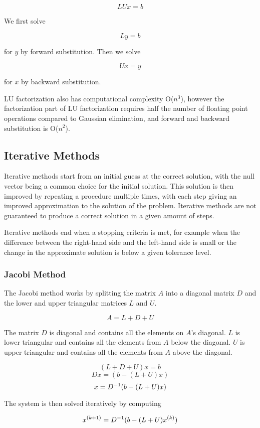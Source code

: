 $$LUx = b$$

We first solve 

$$Ly = b$$

for $y$ by forward substitution. Then we solve 

$$Ux = y$$

for $x$ by backward substitution.

LU factorization also has computational complexity O($n^3$), however the factorization part of 
LU factorization requires half the number of floating point operations compared to Gaussian elimination, 
and forward and backward substitution is O($n^2$)\cite{Kreyszig}.

\subsection{Iterative Methods}

Iterative methods start from an initial guess at the correct solution, 
with the null vector being a common choice for the initial solution. This 
solution is then improved by repeating a procedure multiple times, with each step 
giving an improved approximation to the solution of the problem. Iterative methods 
are not guaranteed to produce a correct solution in a given amount of steps. 

Iterative methods end when a stopping criteria is met, for example when the difference 
between the right-hand side and the left-hand side is small or the change in the approximate 
solution is below a given tolerance level. 

\subsubsection{Jacobi Method}

The Jacobi method works by splitting the matrix $A$ into a diagonal matrix $D$ 
and the lower and upper triangular matrices $L$ and $U$. 

$$A = L+D+U$$

The matrix $D$ is diagonal and contains all the elements on $A$'s diagonal. $L$ 
is lower triangular and contains all the elements from $A$ below the diagonal. 
$U$ is upper triangular and contains all the elements from $A$ above the diagonal.

$$(L+D+U)x = b$$
$$Dx = (b - (L+U)x)$$
$$x = {D}^{-1}(b - (L+U)x)$$

The system is then solved iteratively by computing 

$$x^{(k+1)} = {D}^{-1}(b - (L+U)x^{(k)})$$

